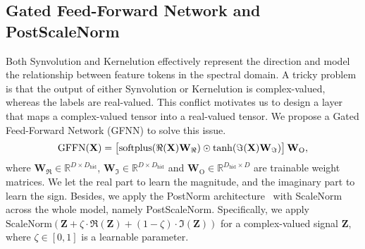 \subsection{Gated Feed-Forward Network and PostScaleNorm}
Both Synvolution and Kernelution effectively represent the direction and model the relationship between feature tokens in the spectral domain. A tricky problem is that the output of either Synvolution or Kernelution is complex-valued, whereas the labels are real-valued. This conflict motivates us to design a layer that maps a complex-valued tensor into a real-valued tensor. We propose a Gated Feed-Forward Network (GFNN) to solve this issue.
\begin{equation}\label{eq:gffn}
\centering
\mathrm{GFFN}(\mathbf{X}) = \left[\mathrm{softplus}(\Re(\mathbf{X})\mathbf{W}_{\Re})\odot\tanh(\Im(\mathbf{X})\mathbf{W}_{\Im})\right]\mathbf{W}_{\text{O}},
\end{equation}
where $\mathbf{W}_{\Re} \in \mathbb{R}^{D \times D_\text{hid}}$, $\mathbf{W}_{\Im} \in \mathbb{R}^{D \times D_\text{hid}}$ and $\mathbf{W}_{\text{O}} \in \mathbb{R}^{D_\text{hid} \times D}$ are trainable weight matrices. We let the real part to learn the magnitude, and the imaginary part to learn the sign. Besides, we apply the PostNorm architecture~\citep{wang-etal-2019-learning-deep} with ScaleNorm~\citep{nguyen-salazar-2019-transformers} across the whole model, namely PostScaleNorm. Specifically, we apply $\mathrm{ScaleNorm}(\mathbf{Z} + \zeta \cdot \Re(\mathbf{Z}) + (1 - \zeta) \cdot \Im(\mathbf{Z}))$ for a complex-valued signal $\mathbf{Z}$, where $\zeta \in [0, 1]$ is a learnable parameter.